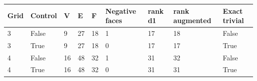 \begin{tabular}{lllllllll}
\hline
Grid & Control & V & E & F & Negative faces & rank d1 & rank augmented & Exact trivial \\
\hline
3 & False & 9 & 27 & 18 & 1 & 17 & 18 & False \\
3 & True & 9 & 27 & 18 & 0 & 17 & 17 & True \\
4 & False & 16 & 48 & 32 & 1 & 31 & 32 & False \\
4 & True & 16 & 48 & 32 & 0 & 31 & 31 & True \\
\hline
\end{tabular}
